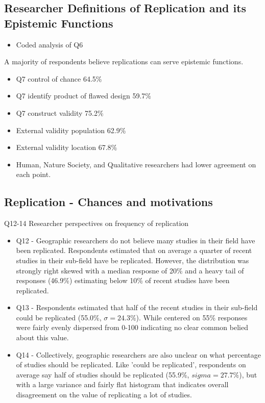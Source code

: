 \documentclass[]{interact}
\theoremstyle{plain}%
\theoremstyle{definition}
\theoremstyle{remark}
\begin{document}
\subsection*{Researcher Definitions of Replication and its Epistemic Functions}
\begin{itemize}
    \item Coded analysis of Q6
\end{itemize}

A majority of respondents believe replications can serve epistemic functions.
\begin{itemize}
    \item Q7 control of chance 64.5\%
    \item Q7 identify product of flawed design 59.7\%
    \item Q7 construct validity 75.2\%
    \item External validity population 62.9\%
    \item External validity location 67.8\%
    \item Human, Nature Society, and Qualitative researchers had lower agreement on each point.
\end{itemize}

\subsection*{Replication - Chances and motivations}
Q12-14 Researcher perspectives on frequency of replication
\begin{itemize}
    \item Q12 - Geographic researchers do not believe many studies in their field have been replicated. Respondents estimated that on average a quarter of recent studies in their sub-field have be replicated. However, the distribution was strongly right skewed with a median resposne of 20\% and a heavy tail of responses (46.9\%) estimating below 10\% of recent studies have been replicated.
    \item Q13 - Respondents estimated that half of the recent studies in their sub-field could be replicated (55.0\%, $\sigma = 24.3\%$). While centered on 55\% responses were fairly evenly dispersed from 0-100 indicating no clear common belied about this value. 
    \item Q14 - Collectively, geographic researchers are also unclear on what percentage of studies should be replicated. Like 'could be replicated', respondents on average say half of studies should be replicated (55.9\%, $sigma=27.7\%$), but with a large variance and fairly flat histogram that indicates overall disagreement on the value of replicating a lot of studies. 
\end{itemize}
\end{document}
